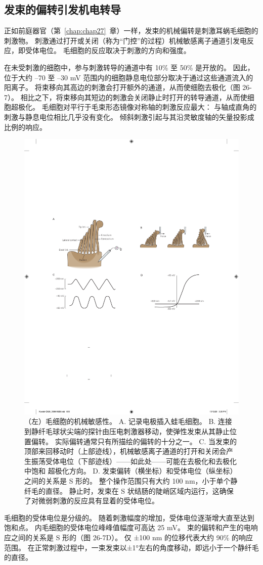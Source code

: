 \subsection{发束的偏转引发机电转导}

正如前庭器官（第~\ref{chap:chap27}~章）一样，发束的机械偏转是刺激耳蜗毛细胞的刺激物。
刺激通过打开或关闭（称为“门控”的过程）机械敏感离子通道引发电反应，即受体电位。
毛细胞的反应取决于刺激的方向和强度。


在未受刺激的细胞中，参与刺激转导的通道中有 10\% 至 50\% 是开放的。
因此，位于大约 –70 至 –30 mV 范围内的细胞静息电位部分取决于通过这些通道流入的阳离子。
将束移向其高边的刺激会打开额外的通道，从而使细胞去极化（图 26-7）。
相比之下，将束移向其短边的刺激会关闭静止时打开的转导通道，从而使细胞超极化。
毛细胞对平行于毛束形态镜像对称轴的刺激反应最大：
与轴成直角的刺激与静息电位相比几乎没有变化。
倾斜刺激引起与其沿灵敏度轴的矢量投影成比例的响应。


\begin{figure}[htbp]
	\centering
	\includegraphics[width=0.5\linewidth]{chap26/fig_26_7}
	\caption{（左）毛细胞的机械敏感性。
		A. 记录电极插入蛙毛细胞。
		B. 连接到静纤毛球状尖端的探针由压电刺激器移动，使弹性发束从其静止位置偏转。
		实际偏转通常只有所描绘的偏转的十分之一。
		C. 当发束的顶部来回移动时（上部迹线），机械敏感离子通道的打开和关闭会产生振荡受体电位（下部迹线）——如此处——可能在去极化和去极化中饱和 超极化方向。
		D. 发束偏转（横坐标）和受体电位（纵坐标）之间的关系是 S 形的。
		整个操作范围只有大约 100 nm，小于单个静纤毛的直径。
		静止时，发束在 S 状结肠的陡峭区域内运行，这确保了对微弱刺激的反应具有显着的受体电位。}
	\label{fig:26_7}
\end{figure}


毛细胞的受体电位是分级的。
随着刺激幅度的增加，受体电位逐渐增大直至达到饱和点。
内毛细胞的受体电位峰峰值幅度可高达 25 mV。
束的偏转和产生的电响应之间的关系是 S 形的（图 26-7D）。 
仅 ±100 nm 的位移代表大约 90\% 的响应范围。
在正常刺激过程中，一束发束以±1°左右的角度移动，即远小于一个静纤毛的直径。


